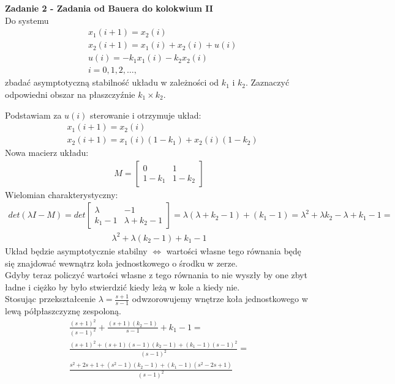 \documentclass[a4paper,11pt]{article}
\begin{document}
\newpage
\begin{framed}
\textbf{Zadanie 2 - Zadania od Bauera do kolokwium II } \\ 
Do systemu
\begin{align*}
& x_{1}(i+1)=x_{2}(i) \\
& x_{2}(i+1)=x_{1}(i)+x_{2}(i)+u(i) \\
& u(i) = -k_{1}x_{1}(i)-k_{2}x_{2}(i) \\
& i = 0, 1, 2, \dots,
\end{align*}
zbadać asymptotyczną stabilność układu w zależności od \( k_{1} \) i \( k_{2} \). Zaznaczyć odpowiedni obszar na płaszczyźnie \( k_{1} \times k_{2} \).
\end{framed}
Podstawiam za \( u(i) \) sterowanie i otrzymuje układ:
\begin{align*}
& x_{1}(i+1)=x_{2}(i) \\
& x_{2}(i+1)=x_{1}(i)(1-k_{1})+x_{2}(i)(1-k_{2})
\end{align*}
Nowa macierz układu:
\begin{align*}
M = 
\begin{bmatrix}
0 & 1 \\
1-k_{1} & 1-k_{2}
\end{bmatrix}
\end{align*}
Wielomian charakterystyczny:
\begin{align*}
det(\lambda I - M) =
det
\begin{bmatrix}
\lambda & -1 \\
k_{1}-1 & \lambda+k_{2}-1
\end{bmatrix}
=
\lambda(\lambda+k_{2}-1)+(k_{1}-1)
=
\lambda^{2}+\lambda k_{2} -\lambda+k_{1}-1 =
\end{align*}
\begin{align*}
\lambda^{2}+\lambda(k_{2}-1)+k_{1}-1
\end{align*}
Układ będzie asymptotycznie stabilny \( \Leftrightarrow \) wartości własne tego równania będę się znajdować wewnątrz koła jednostkowego o środku w zerze. \\ 
Gdyby teraz policzyć wartości własne z tego równania to nie wyszły by one zbyt ładne i ciężko by było stwierdzić kiedy leżą w kole a kiedy nie. \\
Stosując przekształcenie \( \lambda = \frac{s+1}{s-1} \) odwzorowujemy wnętrze koła jednostkowego w lewą półpłaszczyznę zespoloną. 
\begin{align*}
\frac{(s+1)^{2}}{(s-1)^{2}}+\frac{(s+1)(k_{2}-1)}{s-1}+k_{1}-1=\\
\frac{(s+1)^{2}+(s+1)(s-1)(k_{2}-1)+(k_{1}-1)(s-1)^{2}}{(s-1)^{2}} = \\
\frac{s^{2}+2s+1+(s^{2}-1)(k_{2}-1)+(k_{1}-1)(s^{2}-2s+1)}{(s-1)^{2}}
\end{align*}
\end{document}
